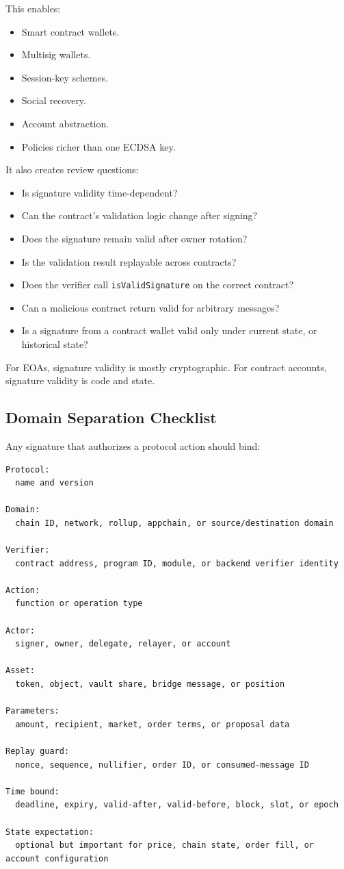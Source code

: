 This enables:

\begin{itemize}
\tightlist
\item
  Smart contract wallets.
\item
  Multisig wallets.
\item
  Session-key schemes.
\item
  Social recovery.
\item
  Account abstraction.
\item
  Policies richer than one ECDSA key.
\end{itemize}

It also creates review questions:

\begin{itemize}
\tightlist
\item
  Is signature validity time-dependent?
\item
  Can the contract's validation logic change after signing?
\item
  Does the signature remain valid after owner rotation?
\item
  Is the validation result replayable across contracts?
\item
  Does the verifier call \passthrough{\lstinline!isValidSignature!} on
  the correct contract?
\item
  Can a malicious contract return valid for arbitrary messages?
\item
  Is a signature from a contract wallet valid only under current state,
  or historical state?
\end{itemize}

For EOAs, signature validity is mostly cryptographic. For contract
accounts, signature validity is code and state.

\subsection{Domain Separation Checklist}

Any signature that authorizes a protocol action should bind:

\begin{lstlisting}
Protocol:
  name and version

Domain:
  chain ID, network, rollup, appchain, or source/destination domain

Verifier:
  contract address, program ID, module, or backend verifier identity

Action:
  function or operation type

Actor:
  signer, owner, delegate, relayer, or account

Asset:
  token, object, vault share, bridge message, or position

Parameters:
  amount, recipient, market, order terms, or proposal data

Replay guard:
  nonce, sequence, nullifier, order ID, or consumed-message ID

Time bound:
  deadline, expiry, valid-after, valid-before, block, slot, or epoch

State expectation:
  optional but important for price, chain state, order fill, or account configuration
\end{lstlisting}

